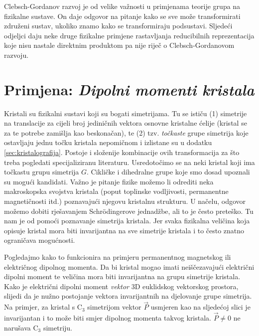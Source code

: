 Clebsch-Gordanov razvoj je od velike važnosti u primjenama teorije
grupa na fizikalne sustave. On  daje odgovor na pitanje
kako se sve može transformirati združeni sustav, ukoliko znamo kako
se transformiraju podsustavi. Sljedeći odjeljci daju neke druge fizikalne
primjene rastavljanja reducibilnih reprezentacija koje nisu nastale
direktnim produktom pa nije riječ o Clebsch-Gordanovom razvoju.

\section{Primjena: \emph{Dipolni momenti kristala}}
\label{sec:dipolni}

  
Kristali su fizikalni sustavi koji su bogati simetrijama. Tu se
ističu (1) simetrije na translacije za cijeli broj jediničnih vektora
osnovne kristalne ćelije (kristal se za te potrebe zamišlja kao beskonačan),
te (2) tzv. \emph{točkaste} grupe simetrija koje ostavljaju jednu točku
kristala nepomičnom i izlistane su u dodatku \ref{sec:kristalografija}.
Postoje i složenije kombinacije ovih transformacija za što treba pogledati
specijaliziranu literaturu. Usredotočimo se na neki kristal koji
ima točkastu grupu simetrija $G$. Cikličke i dihedralne grupe koje smo
dosad upoznali su mogući kandidati. Važno je pitanje fizike možemo li odrediti
neka makroskopska svojstva kristala (poput toplinske vodljivosti,
permanentne magnetičnosti itd.) poznavajući njegovu kristalnu strukturu.
U načelu, odgovor možemo dobiti rješavanjem Schr\"{o}dingerove jednadžbe,
ali to je često preteško. Tu nam je od pomoći poznavanje simetrija
kristala. Jer svaka fizikalna veličina koja opisuje kristal mora
biti invarijantna na sve simetrije kristala i to često znatno
ograničava mogućnosti.

Pogledajmo kako to funkcionira na primjeru
permanentnog magnetskog ili električnog dipolnog
momenta. Da bi kristal mogao imati neiščezavajući
električni dipolni moment
te veličina mora biti invarijantna na grupu simetrije
kristala.
Kako je električni dipolni moment \emph{vektor} 3D euklidskog vektorskog prostora,
slijedi da je nužno postojanje vektora invarijantnih na djelovanje grupe simetrija.
Na primjer, za kristal s C$_3$ simetrijom vektor $\vec{P}$ usmjeren
kao na sljedećoj slici je invarijantan i
to može biti smjer dipolnog momenta takvog kristala. $\vec{P}\neq 0$
ne narušava C$_3$ simetriju.

\centerline{}

